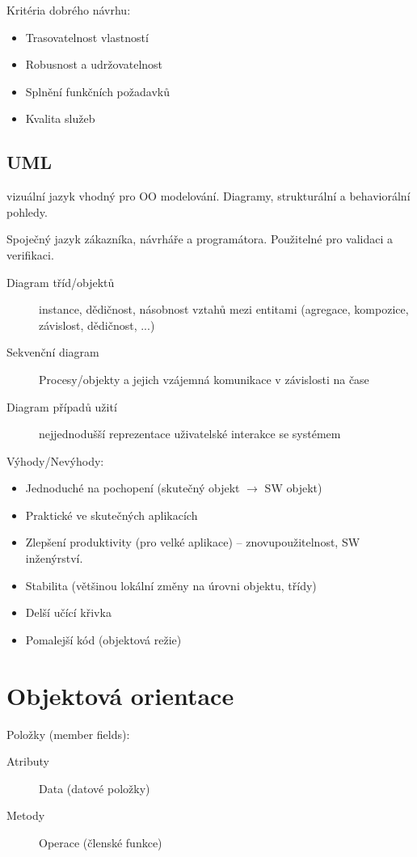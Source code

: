 \documentclass[a4paper, 11pt]{report}
\begin{document}
Kritéria dobrého návrhu:
\begin{itemize}
	\item Trasovatelnost vlastností
	\item Robusnost a udržovatelnost
	\item Splnění funkčních požadavků
	\item Kvalita služeb
\end{itemize}

\subsection{UML}
vizuální jazyk vhodný pro OO modelování. Diagramy, strukturální a behaviorální pohledy.

Spoječný jazyk zákazníka, návrháře a programátora. Použitelné pro validaci a verifikaci.

\begin{description}
	\item[Diagram tříd/objektů] instance, dědičnost, násobnost vztahů mezi entitami (agregace, kompozice, závislost, dědičnost, ...)
	\item[Sekvenční diagram] Procesy/objekty a jejich vzájemná komunikace v závislosti na čase
	\item[Diagram případů užití] nejjednodušší reprezentace uživatelské interakce se systémem
\end{description}

Výhody/Nevýhody:
\begin{itemize}
	\item Jednoduché na pochopení (skutečný objekt $\to$ SW objekt)
	\item Praktické ve skutečných aplikacích
	\item Zlepšení produktivity (pro velké aplikace) -- znovupoužitelnost, SW inženýrství.
	\item Stabilita (většinou lokální změny na úrovni objektu, třídy)
	\item Delší učící křivka
	\item Pomalejší kód (objektová režie)
\end{itemize}

\section{Objektová orientace}

Položky (member fields):
\begin{description}
	\item[Atributy] Data (datové položky)
	\item[Metody] Operace (členské funkce)
\end{description}
\end{document}
